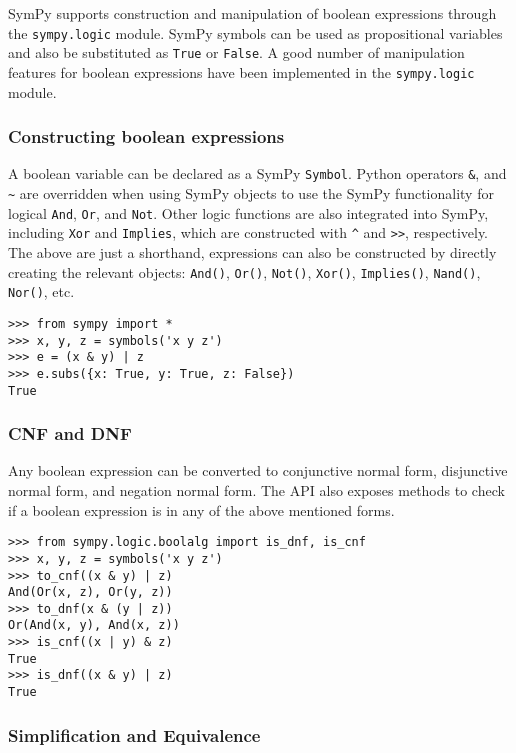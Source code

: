 
SymPy supports construction and manipulation of boolean expressions
through the \texttt{sympy.logic} module. SymPy symbols can be used as
propositional variables and also be substituted as \texttt{True}
or \texttt{False}. A good number of manipulation features for boolean
expressions have been implemented in the \texttt{sympy.logic} module.

\subsubsection{Constructing boolean expressions}

A boolean variable can be declared as a SymPy \verb|Symbol|. Python operators
\texttt{\&}, \texttt{\textbar{}} and \texttt{\textasciitilde{}} are overridden
when using SymPy objects to use the SymPy functionality for logical
\texttt{And}, \texttt{Or}, and \texttt{Not}. Other logic functions are also
integrated into SymPy, including \texttt{Xor} and \texttt{Implies}, which are
constructed with \texttt{\^{}} and \texttt{\textgreater{}\textgreater{}},
respectively. The above are just a shorthand, expressions can also be
constructed by directly creating the relevant objects: \verb|And()|,
\verb|Or()|, \verb|Not()|, \verb|Xor()|, \verb|Implies()|, \verb|Nand()|,
\verb|Nor()|, etc.

\begin{verbatim}
>>> from sympy import *
>>> x, y, z = symbols('x y z')
>>> e = (x & y) | z
>>> e.subs({x: True, y: True, z: False})
True
\end{verbatim}

\subsubsection{CNF and DNF}

Any boolean expression can be converted to conjunctive normal form, disjunctive
normal form, and negation normal form. The API also exposes methods to check if
a boolean expression is in any of the above mentioned forms.

\begin{verbatim}
>>> from sympy.logic.boolalg import is_dnf, is_cnf
>>> x, y, z = symbols('x y z')
>>> to_cnf((x & y) | z)
And(Or(x, z), Or(y, z))
>>> to_dnf(x & (y | z))
Or(And(x, y), And(x, z))
>>> is_cnf((x | y) & z)
True
>>> is_dnf((x & y) | z)
True
\end{verbatim}

\subsubsection{Simplification and Equivalence}

